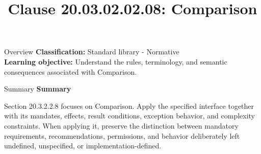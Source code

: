 \documentclass[10pt,letterpaper]{article}
\title{Clause 20.03.02.02.08: Comparison}
\author{}
\date{}
\begin{document}
\maketitle
\begin{CornellOverviewBox}{Overview}
\textbf{Classification:} Standard library - Normative\\[2pt]
\textbf{Learning objective:} Understand the rules, terminology, and semantic consequences associated with Comparison.
\end{CornellOverviewBox}\begin{CornellSummaryBox}{Summary}
{\sffamily\bfseries\color{Accent} Summary}\par\vspace{3pt}Section 20.3.2.2.8 focuses on Comparison. Apply the specified interface together with its mandates, effects, result conditions, exception behavior, and complexity constraints. When applying it, preserve the distinction between mandatory requirements, recommendations, permissions, and behavior deliberately left undefined, unspecified, or implementation-defined.
\end{CornellSummaryBox}
\end{document}
